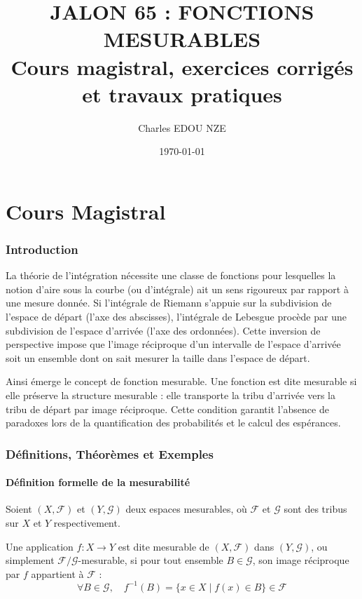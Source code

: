 \documentclass[11pt,a4paper]{article}
\title{\Huge JALON 65 : FONCTIONS MESURABLES \\ \large Cours magistral, exercices corrigés et travaux pratiques}
\author{\Large Charles EDOU NZE}
\date{\today}
\begin{document}
\maketitle
\tableofcontents
\newpage

\part{Cours Magistral}


\section{Introduction}

La théorie de l'intégration nécessite une classe de fonctions pour lesquelles la notion d'aire sous la courbe (ou d'intégrale) ait un sens rigoureux par rapport à une mesure donnée. Si l'intégrale de Riemann s'appuie sur la subdivision de l'espace de départ (l'axe des abscisses), l'intégrale de Lebesgue procède par une subdivision de l'espace d'arrivée (l'axe des ordonnées). Cette inversion de perspective impose que l'image réciproque d'un intervalle de l'espace d'arrivée soit un ensemble dont on sait mesurer la taille dans l'espace de départ.

Ainsi émerge le concept de fonction mesurable. Une fonction est dite mesurable si elle préserve la structure mesurable : elle transporte la tribu d'arrivée vers la tribu de départ par image réciproque. Cette condition garantit l'absence de paradoxes lors de la quantification des probabilités et le calcul des espérances.

\section{Définitions, Théorèmes et Exemples}

\subsection*{Définition formelle de la mesurabilité}

Soient $(X, \mathcal{F})$ et $(Y, \mathcal{G})$ deux espaces mesurables, où $\mathcal{F}$ et $\mathcal{G}$ sont des tribus sur $X$ et $Y$ respectivement.

Une application $f : X \to Y$ est dite mesurable de $(X, \mathcal{F})$ dans $(Y, \mathcal{G})$, ou simplement $\mathcal{F}/\mathcal{G}$-mesurable, si pour tout ensemble $B \in \mathcal{G}$, son image réciproque par $f$ appartient à $\mathcal{F}$ :
$$ \forall B \in \mathcal{G}, \quad f^{-1}(B) = \{ x \in X \mid f(x) \in B \} \in \mathcal{F} $$
\end{document}
